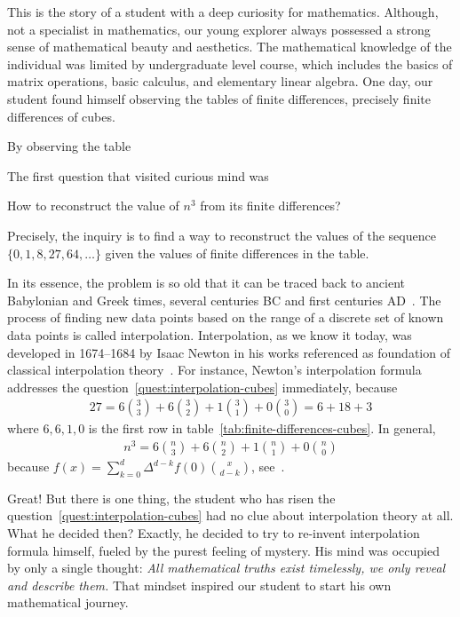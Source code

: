 This is the story of a student with a deep curiosity for mathematics.
Although, not a specialist in mathematics,
our young explorer always possessed a strong sense of mathematical beauty and aesthetics.
The mathematical knowledge of the individual was limited by undergraduate level course, which includes the basics of
matrix operations, basic calculus, and elementary linear algebra.
One day, our student found himself observing the tables of finite differences, precisely finite differences of cubes.

By observing the table

The first question that visited curious mind was
\begin{question}
    \label{quest:interpolation-cubes}
    How to reconstruct the value of $n^3$ from its finite differences?
\end{question}
Precisely, the inquiry is to find a way to reconstruct the values of the sequence $\{0, 1, 8, 27, 64, \ldots\}$
given the values of finite differences in the table.

In its essence, the problem is so old that it can be traced back to ancient Babylonian and Greek times,
several centuries BC and first centuries AD~\cite{gautschi2012interpolation}.
The process of finding new data points based on the range of a discrete set
of known data points is called interpolation.
Interpolation, as we know it today, was developed in 1674--1684 by Isaac Newton
in his works referenced as foundation of classical interpolation theory~\cite{meijering2002chronology}.
For instance, Newton's interpolation formula addresses the question~\eqref{quest:interpolation-cubes} immediately,
because
\begin{align*}
    27 = 6 \binom{3}{3} + 6 \binom{3}{2} + 1 \binom{3}{1} + 0\binom{3}{0} = 6 + 18 + 3
\end{align*}
where $6,6,1,0$ is the first row in table~\eqref{tab:finite-differences-cubes}.
In general,
\begin{align*}
    n^3 = 6 \binom{n}{3} + 6 \binom{n}{2} + 1\binom{n}{1} + 0 \binom{n}{0}
\end{align*}
because $f(x) = \sum_{k=0}^{d} \Delta^{d-k} f(0) \binom{x}{d-k}$, see~\cite[~p. 190]{graham1994concrete}.

Great!
But there is one thing, the student who has risen the question~\eqref{quest:interpolation-cubes}
had no clue about interpolation theory at all.
What he decided then?
Exactly, he decided to try to re-invent interpolation formula himself,
fueled by the purest feeling of mystery.
His mind was occupied by only a single thought:
\textit{All mathematical truths exist timelessly, we only reveal and describe them.}
That mindset inspired our student to start his own mathematical journey.

